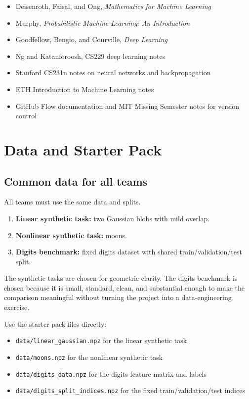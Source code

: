 \documentclass[11pt]{article}
\newcommand{\filepath}[1]{\nolinkurl{#1}}
\begin{document}
\begin{itemize}
    \item Deisenroth, Faisal, and Ong, \emph{Mathematics for Machine Learning} \cite{deisenroth2020}
    \item Murphy, \emph{Probabilistic Machine Learning: An Introduction} \cite{murphy2022}
    \item Goodfellow, Bengio, and Courville, \emph{Deep Learning} \cite{goodfellow2016}
    \item Ng and Katanforoosh, CS229 deep learning notes \cite{ngdeep}
    \item Stanford CS231n notes on neural networks and backpropagation \cite{cs231n_nn,cs231n_backprop}
    \item ETH Introduction to Machine Learning notes \cite{ethml2024}
    \item GitHub Flow documentation and MIT Missing Semester notes for version control \cite{githubflow,missingsemester}
\end{itemize}

\section{Data and Starter Pack}

\subsection{Common data for all teams}

All teams must use the same data and splits.

\begin{enumerate}
    \item \textbf{Linear synthetic task:} two Gaussian blobs with mild overlap.
    \item \textbf{Nonlinear synthetic task:} moons.
    \item \textbf{Digits benchmark:} fixed digits dataset with shared train/validation/test split.
\end{enumerate}

The synthetic tasks are chosen for geometric clarity. The digits benchmark is chosen because it is small, standard, clean, and substantial enough to make the comparison meaningful without turning the project into a data-engineering exercise.

Use the starter-pack files directly:

\begin{itemize}
    \item \filepath{data/linear_gaussian.npz} for the linear synthetic task
    \item \filepath{data/moons.npz} for the nonlinear synthetic task
    \item \filepath{data/digits_data.npz} for the digits feature matrix and labels
    \item \filepath{data/digits_split_indices.npz} for the fixed train/validation/test indices
\end{itemize}
\end{document}
